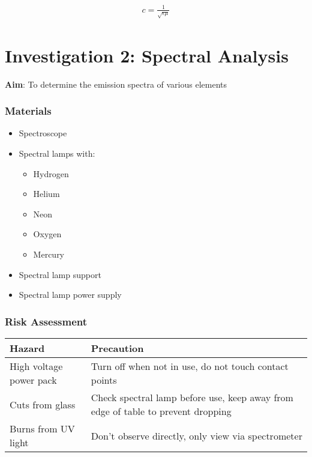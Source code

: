 \documentclass{report}
\begin{document}
			\begin{align*}
				c = \frac{1}{\sqrt{\epsilon \mu}}
			\end{align*}

		
\newpage

	\section{Investigation 2: Spectral Analysis}
	
		\textbf{Aim}: To determine the emission spectra of various elements

		\subsubsection{Materials}
		
			\begin{itemize}
				\item Spectroscope
				\item Spectral lamps with:
					\begin{itemize}
						\item Hydrogen
						\item Helium
						\item Neon
						\item Oxygen
						\item Mercury
					\end{itemize}
				\item Spectral lamp support
				\item Spectral lamp power supply
			\end{itemize}

		\subsubsection{Risk Assessment}

			\begin{table}[H]
				\centering
				\begin{tabular}{p{7cm}|p{7cm}}
					\textbf{Hazard} & \textbf{Precaution} \\ \hline
					High voltage power pack & Turn off when not in use, do not touch contact points \\
					Cuts from glass & Check spectral lamp before use, keep away from edge of table to prevent dropping \\
					Burns from UV light & Don't observe directly, only view via spectrometer
					
				\end{tabular}
			\end{table}
\end{document}
